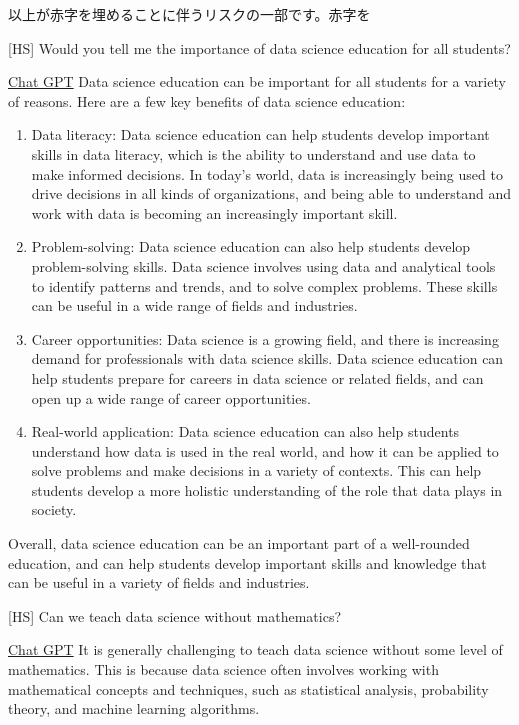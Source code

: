 \documentclass[
]{book}
\providecommand{\tightlist}{%
  \setlength{\itemsep}{0pt}\setlength{\parskip}{0pt}}
\theoremstyle{definition}
\theoremstyle{definition}
\theoremstyle{definition}
\theoremstyle{definition}
\theoremstyle{remark}
\begin{document}
以上が赤字を埋めることに伴うリスクの一部です。赤字を

{[}HS{]} Would you tell me the importance of data science education for all students?

\protect\hyperlink{chatgpt}{Chat GPT} Data science education can be important for all students for a variety of reasons. Here are a few key benefits of data science education:

\begin{enumerate}
\def\labelenumi{\arabic{enumi}.}
\tightlist
\item
  Data literacy: Data science education can help students develop important skills in data literacy, which is the ability to understand and use data to make informed decisions. In today's world, data is increasingly being used to drive decisions in all kinds of organizations, and being able to understand and work with data is becoming an increasingly important skill.
\item
  Problem-solving: Data science education can also help students develop problem-solving skills. Data science involves using data and analytical tools to identify patterns and trends, and to solve complex problems. These skills can be useful in a wide range of fields and industries.
\item
  Career opportunities: Data science is a growing field, and there is increasing demand for professionals with data science skills. Data science education can help students prepare for careers in data science or related fields, and can open up a wide range of career opportunities.
\item
  Real-world application: Data science education can also help students understand how data is used in the real world, and how it can be applied to solve problems and make decisions in a variety of contexts. This can help students develop a more holistic understanding of the role that data plays in society.
\end{enumerate}

Overall, data science education can be an important part of a well-rounded education, and can help students develop important skills and knowledge that can be useful in a variety of fields and industries.

{[}HS{]} Can we teach data science without mathematics?

\protect\hyperlink{chatgpt}{Chat GPT} It is generally challenging to teach data science without some level of mathematics. This is because data science often involves working with mathematical concepts and techniques, such as statistical analysis, probability theory, and machine learning algorithms.
\end{document}
